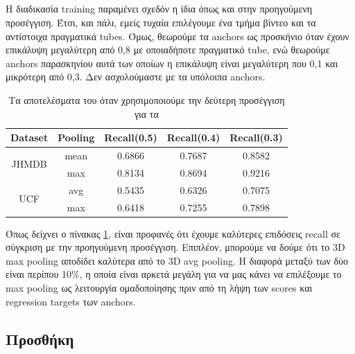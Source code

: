 \subsection{}
Η διαδικασία \en training \gr παραμένει σχεδόν η ίδια όπως και στην προηγούμενη προσέγγιση. Έτσι, και πάλι, εμείς τυχαία επιλέγουμε ένα τμήμα βίντεο και τα αντίστοιχα πραγματικά \en tubes\gr. Όμως,
θεωρούμε τα \en anchors \gr ως προσκήνιο όταν έχουν επικάλυψη  μεγαλύτερη από 0,8 με οποιαδήποτε πραγματικό \en tube\gr, ενώ θεωρούμε \en anchors \gr παρασκηνίου αυτά  των οποίων η επικάλυψη
είναι μεγαλύτερη που 0,1 και μικρότερη από 0,3. Δεν ασχολούμαστε με τα υπόλοιπα \en anchors\gr. 

\en
\begin{table}[h]
  \centering
  \begin{tabular}{||c | c || c  c c||}
    \hline
    \textbf{Dataset} & \textbf{Pooling} &  \textbf{Recall(0.5)} & \textbf{Recall(0.4)} & \textbf{Recall(0.3)} \\
    \hline  \hline
    \multirow{2}{4em}{JHMDB} & mean & 0.6866 & 0.7687 & 0.8582 \\
    \cline{2-5}
    {} & max &  0.8134 & 0.8694 & 0.9216 \\
    \hline
    \multirow{2}{4em}{UCF} & avg &  0.5435 & 0.6326 & 0.7075 \\
    \cline{2-5}
    {} & max & 0.6418 & 0.7255 & 0.7898 \\
    \hline
  \end{tabular}
  \caption{\gr Τα αποτελέσματα του  όταν χρησιμοποιούμε την δεύτερη προσέγγιση για τα }
  \label{table:gr_tpn_2_1}
\end{table}
\gr


Όπως δείχνει ο πίνακας \ref{table:gr_tpn_2_1}, είναι προφανές ότι έχουμε καλύτερες επιδόσεις \en recall \gr σε σύγκριση με την προηγούμενη προσέγγιση.
Επιπλέον, μπορούμε να δούμε ότι το \en 3D max pooling \gr  αποδίδει καλύτερα από το \en 3D avg pooling\gr. Η διαφορά
μεταξύ των δύο είναι περίπου 10\%, η οποία είναι αρκετά μεγάλη για να μας κάνει να επιλέξουμε το \en max pooling \gr ως λειτουργία ομαδοποίησης πριν από τη
λήψη των \en scores \gr και \en regression targets \gr των \en anchors\gr.

\gr
\subsection{\gr Προσθήκη }

